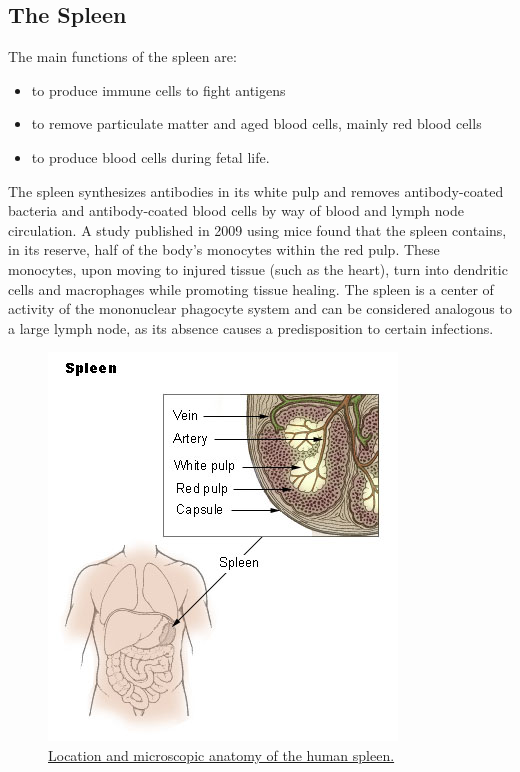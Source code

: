 \hypertarget{the-spleen}{%
\subsection{The Spleen}\label{the-spleen}}

The main functions of the spleen are:

\begin{itemize}
\tightlist
\item
  to produce immune cells to fight antigens
\item
  to remove particulate matter and aged blood cells, mainly red blood cells
\item
  to produce blood cells during fetal life.
\end{itemize}

The spleen synthesizes antibodies in its white pulp and removes antibody-coated bacteria and antibody-coated blood cells by way of blood and lymph node circulation. A study published in 2009 using mice found that the spleen contains, in its reserve, half of the body's monocytes within the red pulp. These monocytes, upon moving to injured tissue (such as the heart), turn into dendritic cells and macrophages while promoting tissue healing. The spleen is a center of activity of the mononuclear phagocyte system and can be considered analogous to a large lymph node, as its absence causes a predisposition to certain infections.



\begin{figure}

{\centering \includegraphics[width=0.7\linewidth]{./figures/immune/Illu_spleen} 

}

\caption{\href{https://commons.wikimedia.org/wiki/File:Illu_spleen.jpg}{Location and microscopic anatomy of the human spleen.}}\label{fig:humanspleen}
\end{figure}

